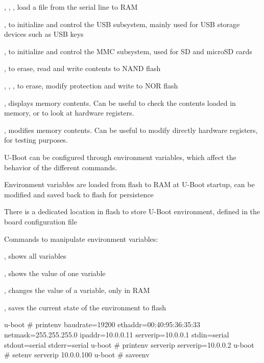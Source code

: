   \startitemize
  \item {}, , , load a file from the
    serial line to RAM
  \item {}, to initialize and control the USB subsystem,
    mainly used for USB storage devices such as USB keys
  \item {}, to initialize and control the MMC subsystem, used
    for SD and microSD cards
  \item {}, to erase, read and write contents to NAND flash
  \item {}, , , to erase, modify
    protection and write to NOR flash
  \item {}, displays memory contents. Can be useful to check the
    contents loaded in memory, or to look at hardware registers.
  \item {}, modifies memory contents. Can be useful to modify
    directly hardware registers, for testing purposes.
\stopitemize

  \startitemize
  \item U-Boot can be configured through environment variables, which
    affect the behavior of the different commands.
  \item Environment variables are loaded from flash to RAM at U-Boot
    startup, can be modified and saved back to flash for persistence
  \item There is a dedicated location in flash to store U-Boot
    environment, defined in the board configuration file
  \item Commands to manipulate environment variables:
    \startitemize
    \item {}, shows all variables
    \item {}, shows the value of one variable
    \item {}, changes the
      value of a variable, only in RAM
    \item {}, saves the current state of the environment to flash
    \stopitemize
  \stopitemize

\starttyping
u-boot # printenv
baudrate=19200
ethaddr=00:40:95:36:35:33
netmask=255.255.255.0
ipaddr=10.0.0.11
serverip=10.0.0.1
stdin=serial
stdout=serial
stderr=serial
u-boot # printenv serverip
serverip=10.0.0.2
u-boot # setenv serverip 10.0.0.100
u-boot # saveenv
\stoptyping

